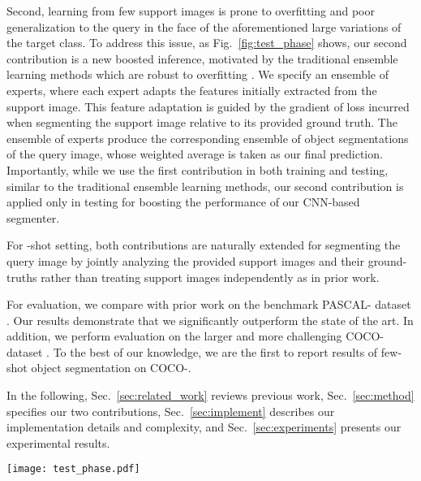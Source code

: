 \documentclass[10pt,twocolumn,letterpaper]{article}
\begin{document}
Second, learning from few support images is prone to overfitting and poor generalization to the query in the face of the aforementioned large variations of the target class. To address this issue, as Fig.~\ref{fig:test_phase} shows, our second contribution is a new boosted inference, motivated by the traditional ensemble learning methods which are robust  to overfitting \cite{freund1999short,  friedman2001greedy}. We specify an ensemble of experts, where each expert adapts the features initially extracted from the support image. This feature adaptation is guided by the gradient of loss incurred when segmenting the support image relative to its provided ground truth. The ensemble of experts produce the corresponding ensemble of object segmentations of the query image, whose weighted average is taken as our final prediction. Importantly, while we use the first contribution in both training and testing, similar to the traditional ensemble learning methods, our second contribution is applied only in testing for boosting the performance of our  CNN-based segmenter. 

For -shot setting, both contributions are naturally extended for segmenting the query image by jointly analyzing the provided support images and their ground-truths rather than treating support images independently as in prior work. 

For evaluation, we compare with prior work on the benchmark PASCAL- dataset \cite{shaban2017one}. Our results demonstrate that we significantly outperform the state of the art. In addition, we perform evaluation on the larger and more challenging COCO- dataset \cite{lin2014microsoft}. To the best of our knowledge, we are the first to report results of few-shot object segmentation on COCO-.


In the following, Sec.~\ref{sec:related_work} reviews previous work, Sec.~\ref{sec:method} specifies our two contributions, Sec.~\ref{sec:implement} describes our implementation details and complexity, and Sec.~\ref{sec:experiments} presents our experimental results.


\begin{figure*}[h!]
    \centering
    \texttt{[image: test\_phase.pdf]}
    \caption{Our new boosted inference: We generate an ensemble of the support's features guided by the gradient of loss, incurred when segmenting the target object in the support image. A dot product between the query's feature maps and the ensemble of the support's features gives the corresponding ensemble of similarity maps, whose weighted average is taken as our final segmentation of the query.}
    \label{fig:test_phase}
\end{figure*}
\end{document}
